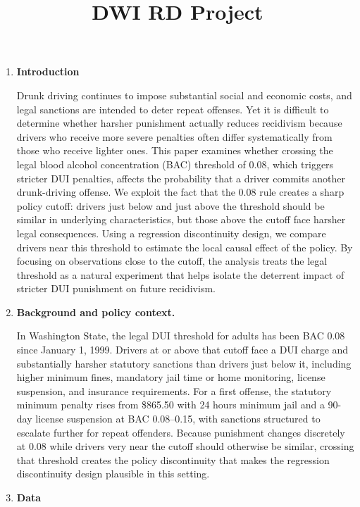 \documentclass[
  letterpaper,
  DIV=11,
  numbers=noendperiod]{scrartcl}
\title{DWI RD Project}
\author{}
\date{}
\begin{document}
\maketitle


\begin{enumerate}
\def\labelenumi{\arabic{enumi}.}
\item
  \textbf{Introduction}

  Drunk driving continues to impose substantial social and economic
  costs, and legal sanctions are intended to deter repeat offenses. Yet
  it is difficult to determine whether harsher punishment actually
  reduces recidivism because drivers who receive more severe penalties
  often differ systematically from those who receive lighter ones. This
  paper examines whether crossing the legal blood alcohol concentration
  (BAC) threshold of 0.08, which triggers stricter DUI penalties,
  affects the probability that a driver commits another drunk-driving
  offense. We exploit the fact that the 0.08 rule creates a sharp policy
  cutoff: drivers just below and just above the threshold should be
  similar in underlying characteristics, but those above the cutoff face
  harsher legal consequences. Using a regression discontinuity design,
  we compare drivers near this threshold to estimate the local causal
  effect of the policy. By focusing on observations close to the cutoff,
  the analysis treats the legal threshold as a natural experiment that
  helps isolate the deterrent impact of stricter DUI punishment on
  future recidivism.
\item
  \textbf{Background and policy context.}

  In Washington State, the legal DUI threshold for adults has been BAC
  0.08 since January 1, 1999. Drivers at or above that cutoff face a DUI
  charge and substantially harsher statutory sanctions than drivers just
  below it, including higher minimum fines, mandatory jail time or home
  monitoring, license suspension, and insurance requirements. For a
  first offense, the statutory minimum penalty rises from \$865.50 with
  24 hours minimum jail and a 90-day license suspension at BAC
  0.08--0.15, with sanctions structured to escalate further for repeat
  offenders. Because punishment changes discretely at 0.08 while drivers
  very near the cutoff should otherwise be similar, crossing that
  threshold creates the policy discontinuity that makes the regression
  discontinuity design plausible in this setting.
\item
  \textbf{Data}


\end{enumerate}
\end{document}
